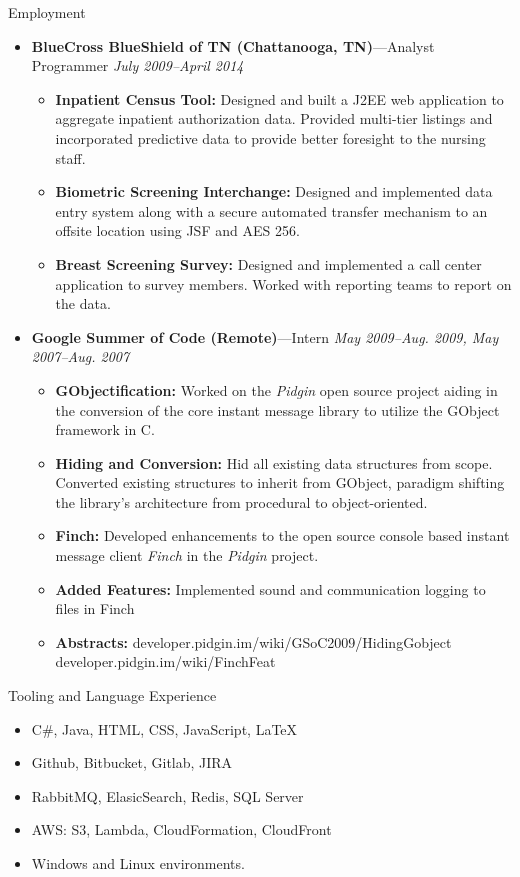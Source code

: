 \documentclass[11pt,oneside]{article}
\newenvironment{ressection}[1]{
	\vspace{4pt}
	{\fontfamily{phv}\selectfont\Large#1}
	\begin{itemize}
	\vspace{3pt}
}{
	\end{itemize}
}
\newcommand{\resitem}[1]{
	\vspace{-4pt}
	\item \begin{flushleft} #1 \end{flushleft}
}
\newcommand{\ressubitem}[1]{
	\vspace{-1pt}
	\item \begin{flushleft} #1 \end{flushleft}
}
\newcommand{\resbigitem}[3]{
	\vspace{-5pt}
	\item
	{\textbf{#1}---#2 \hfill \textit{#3}}
}
\newenvironment{restitledposition}[3]{
	\resbigitem{#1}{#2}{#3}
	\vspace{-2pt}
	\begin{itemize}
}{
	\end{itemize}
}
\begin{document}
\begin{ressection}{Employment}
\begin{restitledposition}{BlueCross BlueShield of TN (Chattanooga, TN)}{Analyst Programmer}{July 2009--April 2014}
		\ressubitem{\textbf{Inpatient Census Tool:} Designed and built a J2EE web 
    application to aggregate inpatient authorization data. Provided 
    multi-tier listings and incorporated predictive data to provide	better 
    foresight to the nursing staff.}
		
		\ressubitem{\textbf{Biometric Screening Interchange:} Designed and implemented
    data entry system along with a secure automated transfer mechanism to an
    offsite location using JSF and AES 256.}

		\ressubitem{\textbf{Breast Screening Survey:} Designed and implemented a call center application
		to survey members. Worked with reporting teams to report on the data.}
	\end{restitledposition}

	\begin{restitledposition}{Google Summer of Code (Remote)}{Intern}{May 2009--Aug. 2009, May 2007--Aug. 2007}
		\ressubitem{\textbf{GObjectification:} Worked on the \textit{Pidgin} open source project
		aiding in the conversion of the core instant message library to utilize the 
		GObject framework in C.}

		\ressubitem{\textbf{Hiding and Conversion:} Hid all existing data structures from scope.
		Converted existing structures to inherit from GObject, paradigm shifting the library's 
		architecture from procedural to object-oriented.}
	
		\ressubitem{\textbf{Finch:} Developed enhancements to the open source console
		based instant message client \textit{Finch} in the \textit{Pidgin} project.}

		\ressubitem{\textbf{Added Features:} Implemented sound and communication logging to files in Finch}

		\ressubitem{\textbf{Abstracts:} developer.pidgin.im/wiki/GSoC2009/HidingGobject
		developer.pidgin.im/wiki/FinchFeat}
	\end{restitledposition}
\end{ressection}

\begin{ressection}{Tooling and Language Experience}
	\resitem{C\#, Java, HTML, CSS, JavaScript, \LaTeX}
	\resitem{Github, Bitbucket, Gitlab, JIRA}
	\resitem{RabbitMQ, ElasicSearch, Redis, SQL Server}
	\resitem{AWS: S3, Lambda, CloudFormation, CloudFront}
	\resitem{Windows and Linux environments.}
\end{ressection}
\end{document}
